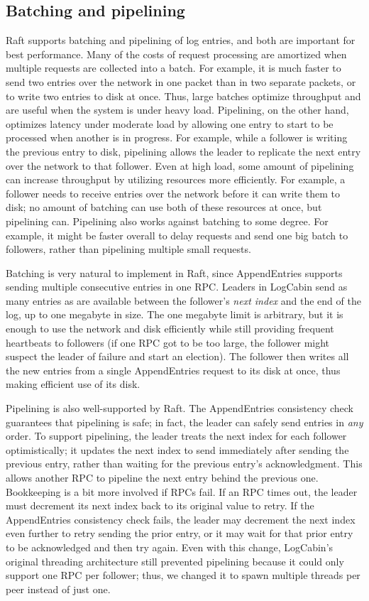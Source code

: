 \subsection{Batching and pipelining}

Raft supports batching and pipelining of log entries, and both are
important for best performance. Many of the costs of request processing are
amortized when multiple requests are collected into a batch. For
example, it is much
faster to send two entries over the network in one packet than in two
separate packets, or to write two entries to disk at once. Thus, large
batches optimize throughput and are useful when the system is under
heavy load. Pipelining, on the other hand, optimizes latency under
moderate load by allowing one entry to start to be processed when
another is in progress. For example, while a follower is writing the
previous entry to disk, pipelining allows the leader to replicate the
next entry over the network to that follower. Even at high load, some
amount of pipelining can increase throughput by utilizing resources more
efficiently. For example, a follower needs to receive entries over the
network before it can write them to disk; no amount of batching can use
both of these resources at once, but pipelining can. Pipelining also
works against batching to some degree. For example, it might be faster
overall to delay requests and send one big batch to followers, rather
than pipelining multiple small requests.

Batching is very natural to implement in Raft, since AppendEntries
supports sending multiple consecutive entries in one RPC. Leaders in
LogCabin send as many entries as are available between the follower's
\emph{next index} and the end of the log, up to one megabyte in size. The one
megabyte limit is arbitrary, but it is enough to use the network and
disk efficiently while still providing frequent heartbeats to followers
(if one RPC got to be too large, the follower might suspect the leader
of failure and start an election). The follower then writes all the new
entries from a single AppendEntries request to its disk at once, thus
making efficient use of its disk.

Pipelining is also well-supported by Raft. The AppendEntries consistency
check guarantees that pipelining is safe; in fact, the leader can safely
send entries in \emph{any} order. To support pipelining, the leader
treats the next index for each follower optimistically; it updates the next index
to send immediately after sending the previous entry, rather than
waiting for the previous entry's acknowledgment. This allows another
RPC to pipeline the next entry behind the previous one. Bookkeeping is a
bit more involved if RPCs fail. If an RPC times out, the leader must
decrement its next index back to its original value to retry. If the
AppendEntries consistency check fails, the leader may decrement the next
index even further to retry sending the prior entry, or it may wait for
that prior entry to be acknowledged and then try again. Even with this
change, LogCabin's original threading architecture still prevented
pipelining because it could only support one RPC per follower; thus, we
changed it to spawn multiple threads per peer instead of just one.
%

